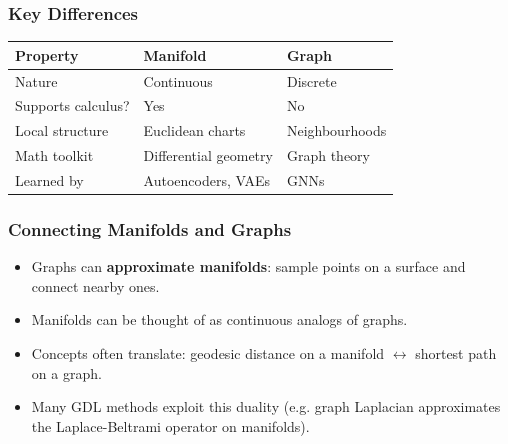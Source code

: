 \begin{frame}[fragile]\frametitle{Key Differences}
    \begin{center}
    \begin{tabular}{lll}
    \hline
    \textbf{Property} & \textbf{Manifold} & \textbf{Graph} \\
    \hline
    Nature & Continuous & Discrete \\
    Supports calculus? & Yes & No \\
    Local structure & Euclidean charts & Neighbourhoods \\
    Math toolkit & Differential geometry & Graph theory \\
    Learned by & Autoencoders, VAEs & GNNs \\
    \hline
    \end{tabular}
    \end{center}
\end{frame}

\begin{frame}[fragile]\frametitle{Connecting Manifolds and Graphs}
    \begin{itemize}
        \item Graphs can \textbf{approximate manifolds}: sample points on a surface and connect nearby ones.
        \item Manifolds can be thought of as continuous analogs of graphs.
        \item Concepts often translate: geodesic distance on a manifold $\leftrightarrow$ shortest path on a graph.
        \item Many GDL methods exploit this duality (e.g. graph Laplacian approximates the Laplace-Beltrami operator on manifolds).
    \end{itemize}
\end{frame}

